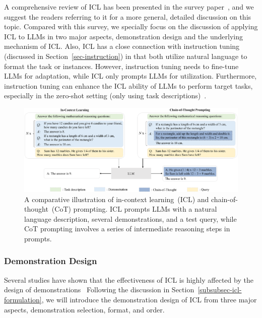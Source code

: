 {
A comprehensive review of ICL has been presented in the survey paper~\cite{Dong-arxiv-2023-A}, and we suggest the readers referring to it for a more general, detailed discussion on this topic. Compared with this survey, we specially focus on the discussion of applying ICL to LLMs in two major aspects, \ie demonstration design and the underlying mechanism of ICL. 
}
Also, ICL has a close connection with instruction tuning (discussed in Section~\ref{sec-instruction}) in that  
{both utilize natural language to format the task or instances}. 
However, instruction tuning needs to fine-tune LLMs for adaptation, while ICL only prompts LLMs for utilization.  
{Furthermore, instruction tuning can enhance the ICL ability of LLMs to perform target tasks, especially in the zero-shot setting (only using task descriptions)~\cite{Chung-arxiv-2022-Scaling}.  
}

\begin{figure}[t]
    \centering
    \includegraphics[width=\textwidth]{images/utilization.pdf}
    \caption{
        A comparative illustration of in-context learning~(ICL) and chain-of-thought~(CoT) prompting. 
        ICL prompts LLMs with a natural language description, several demonstrations, and a test query, while  
        CoT prompting involves a series of intermediate reasoning steps in prompts.
    }
    \label{fig:utilization}
\end{figure}

\subsubsection{Demonstration Design}
{Several studies have shown that the effectiveness of ICL is highly affected by the design of demonstrations~\cite{Min-EMNLP-2022-Rethinking, Lu-ACL-2022-Fantasically,Zhao-ICML-2021-Calibrate}}
Following the discussion in {Section~\ref{subsubsec-icl-formulation}}, we will introduce the demonstration design of ICL from three major aspects, \ie demonstration selection, format, and order.


